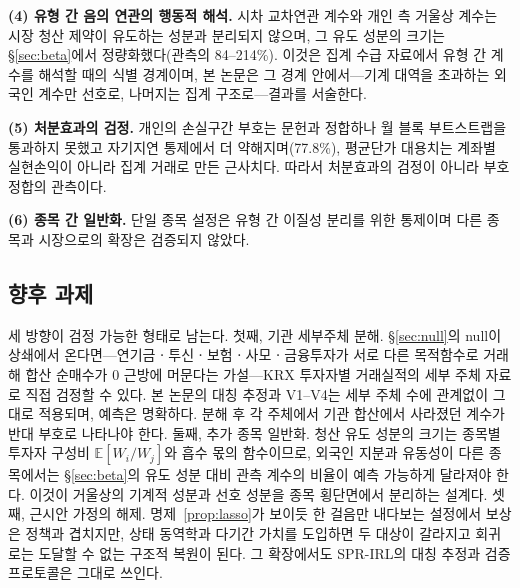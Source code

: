 \textbf{(4) 유형 간 음의 연관의 행동적 해석.} 시차 교차연관 계수와 개인 측 거울상
계수는 시장 청산 제약이 유도하는 성분과 분리되지 않으며, 그 유도 성분의 크기는
\S\ref{sec:beta}에서 정량화했다(관측의 84--214\%). 이것은 집계 수급 자료에서 유형 간
계수를 해석할 때의 식별 경계이며, 본 논문은 그 경계 안에서---기계 대역을 초과하는
외국인 계수만 선호로, 나머지는 집계 구조로---결과를 서술한다.

\textbf{(5) 처분효과의 검정.} 개인의 손실구간 부호는 문헌과 정합하나 월 블록
부트스트랩을 통과하지 못했고 자기지연 통제에서 더 약해지며(77.8\%), 평균단가 대용치는
계좌별 실현손익이 아니라 집계 거래로 만든 근사치다. 따라서 처분효과의 검정이 아니라
부호 정합의 관측이다.

\textbf{(6) 종목 간 일반화.} 단일 종목 설정은 유형 간 이질성 분리를 위한 통제이며
다른 종목과 시장으로의 확장은 검증되지 않았다.

\subsection{향후 과제}
\label{sec:future}

세 방향이 검정 가능한 형태로 남는다. 첫째, 기관 세부주체 분해. \S\ref{sec:null}의
null이 상쇄에서 온다면---연기금ㆍ투신ㆍ보험ㆍ사모ㆍ금융투자가 서로 다른 목적함수로
거래해 합산 순매수가 0 근방에 머문다는 가설---KRX 투자자별 거래실적의 세부 주체
자료로 직접 검정할 수 있다. 본 논문의 대칭 추정과 V1--V4는 세부 주체 수에 관계없이
그대로 적용되며, 예측은 명확하다. 분해 후 각 주체에서 기관 합산에서 사라졌던 계수가
반대 부호로 나타나야 한다. 둘째, 추가 종목 일반화. 청산 유도 성분의 크기는 종목별
투자자 구성비 $\mathbb{E}[W_i/W_j]$와 흡수 몫의 함수이므로, 외국인 지분과 유동성이
다른 종목에서는 \S\ref{sec:beta}의 유도 성분 대비 관측 계수의 비율이 예측 가능하게
달라져야 한다. 이것이 거울상의 기계적 성분과 선호 성분을 종목 횡단면에서 분리하는
설계다. 셋째, 근시안 가정의 해제. 명제~\ref{prop:lasso}가 보이듯 한 걸음만 내다보는
설정에서 보상은 정책과 겹치지만, 상태 동역학과 다기간 가치를 도입하면 두 대상이
갈라지고 회귀로는 도달할 수 없는 구조적 복원이 된다. 그 확장에서도 SPR-IRL의 대칭
추정과 검증 프로토콜은 그대로 쓰인다.
